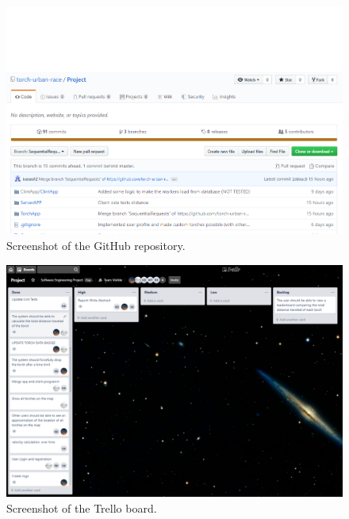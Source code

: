 \documentclass[12pt,a4paper,twoside]{report}
\begin{document}
\newpage

 \begin{figure}
     \centering
     \includegraphics[width=1\linewidth]{GitHubProjectProgress.png}
     \captionsetup{justification=raggedright, singlelinecheck=false} 
     \caption{Screenshot of the GitHub repository.}
     \label{fig:GitHub}
 \end{figure}

 \newpage
 
 \begin{figure}
     \centering
     \includegraphics[width=1\linewidth]{TrelloProjectProgress.png}
     \captionsetup{justification=raggedright, singlelinecheck=false} 
     \caption{Screenshot of the Trello board.}
     \label{fig:Trello}
 \end{figure}
 
 \clearpage
\end{document}
